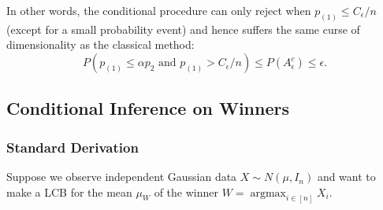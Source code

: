 \documentclass{article}
\DeclareMathOperator*{\argmax}{argmax}
\begin{document}
\begin{appendix}
In other words, the conditional procedure can only reject when $p_{(1)} \leq C_{\epsilon}/n$ (except for a small probability event) and hence suffers the same curse of dimensionality as the classical method:
\begin{equation*}
    P(p_{(1)} \leq \alpha p_{2} \text{ and } p_{(1)} > C_{\epsilon}/n) \leq P(A_{\epsilon}^c) \leq \epsilon.  
\end{equation*}


\subsection{Conditional Inference on Winners}
\label{sec:cond_appdx}

\subsubsection{Standard Derivation}

Suppose we observe independent Gaussian data $X \sim N(\mu, I_n)$ and want to make a LCB for the mean $\mu_W$ of the winner $W = \argmax_{i \in [n]} X_i$. 


\end{appendix}
\end{document}
